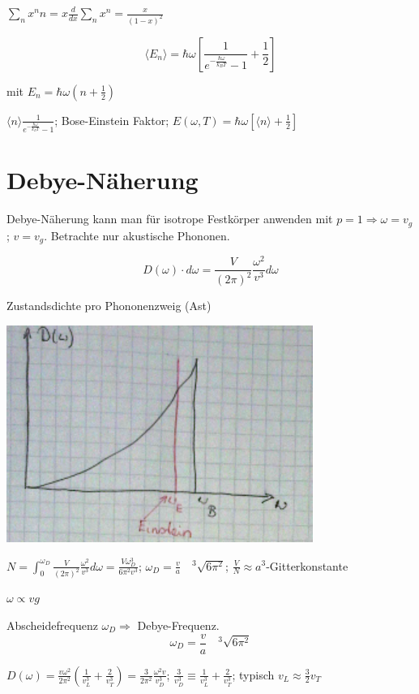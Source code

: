 \(\sum_n x^nn=x\frac{d}{dx}\sum_n x^n = \frac{x}{(1-x)^2}\)

\[ \langle E_n \rangle = \hbar \omega \left[ \frac{1}{e^{-\frac{\hbar \omega}{k_BT}}-1}+\frac{1}{2}\right]\]

mit \(E_n=\hbar\omega(n+\frac{1}{2})\)

\(\langle n \rangle \frac{1}{e^{-\frac{\hbar \omega}{k_BT}}-1}\); Bose-Einstein Faktor; \(E(\omega,T) = \hbar \omega[\langle n \rangle + \frac{1}{2}]\)


\section{Debye-Näherung}

Debye-Näherung kann man für isotrope Festkörper anwenden mit \(p=1\Rightarrow \omega = v_g\); \(v=v_g\). Betrachte nur akustische Phononen.

\[  D(\omega)\cdot d\omega = \frac{V}{(2\pi)^2} \frac{\omega^2}{v^3}  d\omega \]

Zustandsdichte pro Phononenzweig (Ast)

\includegraphics[width=0.75\textwidth]{kap06_14.png}

\(N=\int^{\omega_D}_0\frac{V}{(2\pi)^2} \frac{\omega^2}{v^3}  d\omega = \frac{V\omega^3_D}{6\pi^2 v^3}\); \(\omega_D=\frac{v}{a}\quad ^3\sqrt{6\pi^2}\); \(\frac{V}{N}\approx a^3\)-Gitterkonstante

\(\omega \propto vg\)

Abscheidefrequenz \(\omega_D \Rightarrow\) Debye-Frequenz.
\[\boxed{\omega_D=\frac{v}{a}\quad ^3\sqrt{6\pi^2}}\]

\(D(\omega)= \frac{v\omega^2}{2\pi^2}\left(\frac{1}{v_L^3}+\frac{2}{v^3_T} \right)=\frac{3}{2\pi^2}\frac{\omega^2v}{v_D^3} \); \(\frac{3}{v_D^3}\equiv\frac{1}{v_L^3}+\frac{2}{v_T^3}\); typisch \(v_L\approx \frac{3}{2}v_T\)

